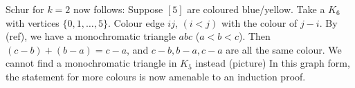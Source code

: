 \documentclass{article}
\begin{document}
\begin{remark}
    Schur for $k=2$ now follows: Suppose $[5]$ are coloured blue/yellow. Take a $K_6$ with vertices $\{0, 1, \dots, 5\}$. Colour edge $ij$, $(i<j)$ with the colour of $j-i$. By (ref), we have a monochromatic triangle $abc$ ($a<b<c$). Then $(c-b) + (b-a) = c-a$, and $c-b, b-a, c-a$ are all the same colour.
    We cannot find a monochromatic triangle in $K_5$ instead (picture)
    In this graph form, the statement for more colours is now amenable to an induction proof.
\end{remark}
\end{document}
